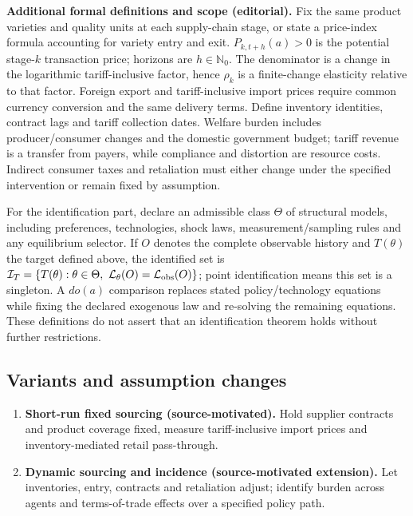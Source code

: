 \documentclass[11pt,a4paper]{article}
\begin{document}
\textbf{Additional formal definitions and scope (editorial).} Fix the same product varieties and quality units at each supply-chain stage, or state a price-index formula accounting for variety entry and exit. \(P_{k,t+h}(a)>0\) is the potential stage-\(k\) transaction price; horizons are \(h\in\mathbb N_0\). The denominator is a change in the logarithmic tariff-inclusive factor, hence \(\rho_k\) is a finite-change elasticity relative to that factor. Foreign export and tariff-inclusive import prices require common currency conversion and the same delivery terms. Define inventory identities, contract lags and tariff collection dates. Welfare burden includes producer/consumer changes and the domestic government budget; tariff revenue is a transfer from payers, while compliance and distortion are resource costs. Indirect consumer taxes and retaliation must either change under the specified intervention or remain fixed by assumption.

For the identification part, declare an admissible class \(\Theta\) of structural models, including preferences, technologies, shock laws, measurement/sampling rules and any equilibrium selector. If \(O\) denotes the complete observable history and \(T(\theta)\) the target defined above, the identified set is \(\mathcal I_T=\{T(\theta):\theta\in\Theta,\ \mathcal L_\theta(O)=\mathcal L_{\rm obs}(O)\}\); point identification means this set is a singleton. A \(do(a)\) comparison replaces stated policy/technology equations while fixing the declared exogenous law and re-solving the remaining equations. These definitions do not assert that an identification theorem holds without further restrictions.
\subsection*{Variants and assumption changes}
\begin{enumerate}
\item \textbf{Short-run fixed sourcing (source-motivated).} Hold supplier contracts and product coverage fixed, measure tariff-inclusive import prices and inventory-mediated retail pass-through.
\item \textbf{Dynamic sourcing and incidence (source-motivated extension).} Let inventories, entry, contracts and retaliation adjust; identify burden across agents and terms-of-trade effects over a specified policy path.
\end{enumerate}
\end{document}
